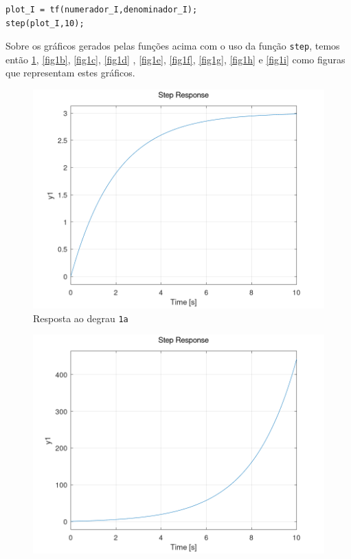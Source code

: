 \documentclass[a4paper,12pt]{article}
\begin{document}
\begin{enumerate}
\begin{lstlisting}
plot_I = tf(numerador_I,denominador_I);
step(plot_I,10);
        \end{lstlisting}
        Sobre os gráficos gerados pelas funções acima com o uso da função \texttt{step}, temos então \ref{fig1a}, \ref{fig1b}, \ref{fig1c}, \ref{fig1d}
        , \ref{fig1e}, \ref{fig1f}, \ref{fig1g}, \ref{fig1h} e \ref{fig1i} como figuras que representam estes gráficos.
        \begin{figure}[h]
            \centering
            \includegraphics[scale=0.4]{../fig/fig1a.png}
            \caption{Resposta ao degrau \texttt{1a}}
            \label{fig1a}
        \end{figure}
        \begin{figure}[h]
            \centering
            \includegraphics[scale=0.4]{../fig/fig1b.png}

\end{figure}
\end{enumerate}
\end{document}
